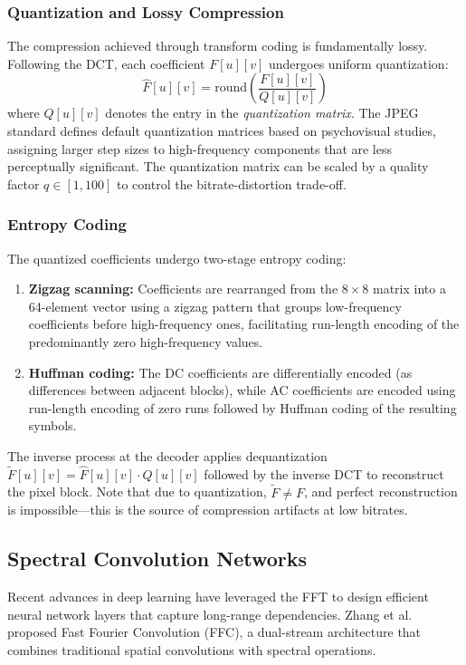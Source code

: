 \documentclass[a4paper]{article}
\theoremstyle{definition}
\begin{document}
\subsubsection{Quantization and Lossy Compression}

The compression achieved through transform coding is fundamentally lossy. Following the DCT, each coefficient \(F[u][v]\) undergoes uniform quantization:
\[
\hat{F}[u][v] = \text{round}\left(\frac{F[u][v]}{Q[u][v]}\right)
\]
where \(Q[u][v]\) denotes the entry in the \textit{quantization matrix}. The JPEG standard defines default quantization matrices based on psychovisual studies, assigning larger step sizes to high-frequency components that are less perceptually significant. The quantization matrix can be scaled by a quality factor \(q \in [1, 100]\) to control the bitrate-distortion trade-off.

\subsubsection{Entropy Coding}

The quantized coefficients undergo two-stage entropy coding:
\begin{enumerate}
    \item \textbf{Zigzag scanning:} Coefficients are rearranged from the \(8 \times 8\) matrix into a 64-element vector using a zigzag pattern that groups low-frequency coefficients before high-frequency ones, facilitating run-length encoding of the predominantly zero high-frequency values.
    \item \textbf{Huffman coding:} The DC coefficients are differentially encoded (as differences between adjacent blocks), while AC coefficients are encoded using run-length encoding of zero runs followed by Huffman coding of the resulting symbols.
\end{enumerate}

The inverse process at the decoder applies dequantization \(\tilde{F}[u][v] = \hat{F}[u][v] \cdot Q[u][v]\) followed by the inverse DCT to reconstruct the pixel block. Note that due to quantization, \(\tilde{F} \neq F\), and perfect reconstruction is impossible—this is the source of compression artifacts at low bitrates. 

\subsection{Spectral Convolution Networks}

Recent advances in deep learning have leveraged the FFT to design efficient neural network layers that capture long-range dependencies. Zhang et al. \cite{10.5555/3495724.3496100} proposed Fast Fourier Convolution (FFC), a dual-stream architecture that combines traditional spatial convolutions with spectral operations.
\end{document}
